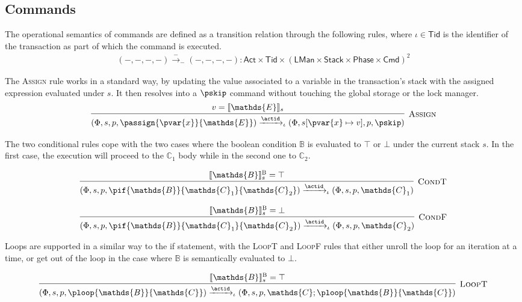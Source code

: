 \subsection{Commands}

The operational semantics of commands are defined as a transition relation through the following rules, where $\iota \in \mathsf{Tid}$ is the identifier of the transaction as part of which the command is executed.
\begin{gather*}
(-, -, -, -) \xrightarrow{-}_- (-, -, -, -) 
: \mathsf{Act} \times \mathsf{Tid} \times (\mathsf{LMan} \times \mathsf{Stack} \times \mathsf{Phase} \times \mathsf{Cmd})^2
\end{gather*}

The \textsc{Assign} rule works in a standard way, by updating the value associated to a variable in the transaction's stack with the assigned expression evaluated under $s$. It then resolves into a $\pskip$ command without touching the global storage or the lock manager.
\[
\infer[\textsc{Assign}]
{
	(\Phi, s, p, \passign{\pvar{x}}{\mathds{E}})
	\xrightarrow{\actid}_\iota
	(\Phi, s[\pvar{x} \mapsto v], p, \pskip)
}
{
	v = \llbracket \mathds{E} \rrbracket_s
}
\]

The two conditional rules cope with the two cases where the boolean condition $\mathds{B}$ is evaluated to $\top$ or $\bot$ under the current stack $s$. In the first case, the execution will proceed to the $\mathds{C}_1$ body while in the second one to $\mathds{C}_2$.

\[
\infer[\textsc{CondT}]
{
	(\Phi, s, p, \pif{\mathds{B}}{\mathds{C}_1}{\mathds{C}_2})
	\xrightarrow{\actid}_\iota
	(\Phi, s, p, \mathds{C}_1)
}
{
	\llbracket \mathds{B} \rrbracket_s^\textsc{B} = \top
}
\]

\[
\infer[\textsc{CondF}]
{
	(\Phi, s, p, \pif{\mathds{B}}{\mathds{C}_1}{\mathds{C}_2})
	\xrightarrow{\actid}_\iota
	(\Phi, s, p, \mathds{C}_2)
}
{
	\llbracket \mathds{B} \rrbracket_s^\textsc{B} = \bot
}
\]

Loops are supported in a similar way to the if statement, with the \textsc{LoopT} and \textsc{LoopF} rules that either unroll the loop for an iteration at a time, or get out of the loop in the case where $\mathds{B}$ is semantically evaluated to $\bot$.

\[
\infer[\textsc{LoopT}]
{
	(\Phi, s, p, \ploop{\mathds{B}}{\mathds{C}})
	\xrightarrow{\actid}_\iota
	(\Phi, s, p, \mathds{C}; \ploop{\mathds{B}}{\mathds{C}})
}
{
	\llbracket \mathds{B} \rrbracket_s^\textsc{B} = \top
}
\]


